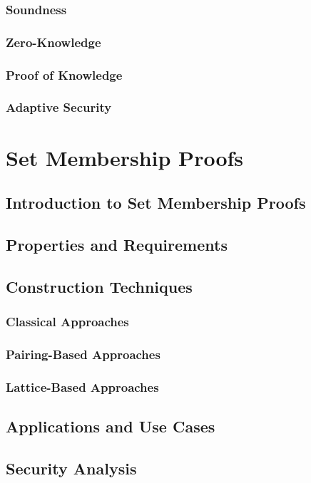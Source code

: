 \documentclass{iacrtrans}
\begin{document}
\subsubsection{Soundness}
\subsubsection{Zero-Knowledge}
\subsubsection{Proof of Knowledge}
\subsubsection{Adaptive Security}

\section{Set Membership Proofs}
\subsection{Introduction to Set Membership Proofs}
\subsection{Properties and Requirements}
\subsection{Construction Techniques}
\subsubsection{Classical Approaches}
\subsubsection{Pairing-Based Approaches}
\subsubsection{Lattice-Based Approaches}

\subsection{Applications and Use Cases}
\subsection{Security Analysis}
\end{document}
